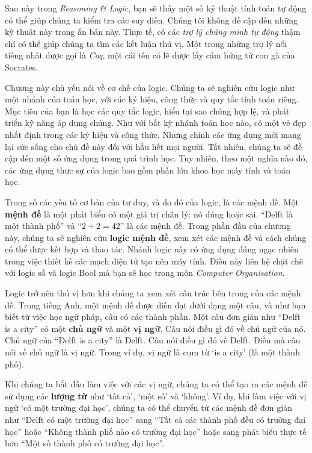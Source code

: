 \begin{infobox}
Sau này trong \emph{Reasoning \& Logic}, bạn sẽ thấy một số kỹ thuật tính toán tự động có thể giúp chúng ta kiểm tra các suy diễn. Chúng tôi không đề cập đến những kỹ thuật này trong ấn bản này. Thực tế, có các \emph{trợ lý chứng minh tự động} thậm chí có thể giúp chúng ta tìm các kết luận thú vị. Một trong những trợ lý nổi tiếng nhất được gọi là \emph{Coq}, một cái tên có lẽ được lấy cảm hứng từ con gà của Socrates.
\end{infobox}

Chương này chủ yếu nói về cơ chế của logic. Chúng ta sẽ nghiên cứu logic như một nhánh của toán học, với các ký hiệu, công thức và quy tắc tính toán riêng. Mục tiêu của bạn là học các quy tắc logic, hiểu tại sao chúng hợp lệ, và phát triển kỹ năng áp dụng chúng. Như với bất kỳ nhánh toán học nào, có một vẻ đẹp nhất định trong các ký hiệu và công thức. Nhưng chính các ứng dụng mới mang lại sức sống cho chủ đề này đối với hầu hết mọi người. Tất nhiên, chúng ta sẽ đề cập đến một số ứng dụng trong quá trình học. Tuy nhiên, theo một nghĩa nào đó, các ứng dụng thực sự của logic bao gồm phần lớn khoa học máy tính và toán học.

Trong số các yếu tố cơ bản của tư duy, và do đó của logic, là các mệnh đề. Một \textbf{mệnh đề} là một phát biểu có một giá trị chân lý: nó đúng hoặc sai. ``Delft là một thành phố'' và ``$2 + 2 = 42$'' là các mệnh đề. Trong phần đầu của chương này, chúng ta sẽ nghiên cứu \textbf{logic mệnh đề}, xem xét các mệnh đề và cách chúng có thể được kết hợp và thao tác. Nhánh logic này có ứng dụng đáng ngạc nhiên trong việc thiết kế các mạch điện tử tạo nên máy tính. Điều này liên hệ chặt chẽ với logic số và logic Bool mà bạn sẽ học trong môn \emph{Computer Organisation}.

Logic trở nên thú vị hơn khi chúng ta xem xét cấu trúc bên trong của các mệnh đề. Trong tiếng Anh, một mệnh đề được diễn đạt dưới dạng một câu, và như bạn biết từ việc học ngữ pháp, câu có các thành phần. Một câu đơn giản như ``Delft is a city'' có một \textbf{chủ ngữ} và một \textbf{vị ngữ}. Câu nói điều gì đó về chủ ngữ của nó. Chủ ngữ của ``Delft is a city'' là Delft. Câu nói điều gì đó về Delft. Điều mà câu nói về chủ ngữ là vị ngữ. Trong ví dụ, vị ngữ là cụm từ `is a city' (là một thành phố).

Khi chúng ta bắt đầu làm việc với các vị ngữ, chúng ta có thể tạo ra các mệnh đề sử dụng các \textbf{lượng từ} như `tất cả', `một số' và `không'. Ví dụ, khi làm việc với vị ngữ `có một trường đại học', chúng ta có thể chuyển từ các mệnh đề đơn giản như ``Delft có một trường đại học'' sang ``Tất cả các thành phố đều có trường đại học'' hoặc ``Không thành phố nào có trường đại học'' hoặc sang phát biểu thực tế hơn ``Một số thành phố có trường đại học''.

